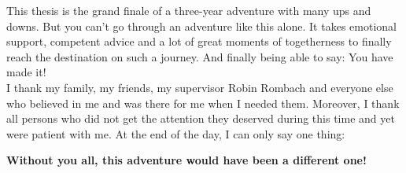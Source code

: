 This thesis is the grand finale of a three-year adventure with many ups and downs. But you can't go through an adventure like this alone. It takes emotional support, competent advice and a lot of great moments of togetherness to finally reach the destination on such a journey. And finally being able to say: You have made it!
\\

\noindent I thank my family, my friends, my supervisor Robin Rombach and everyone else who believed in me and was there for me when I needed them. Moreover, I thank all persons who did not get the attention they deserved during this time and yet were patient with me. At the end of the day, I can only say one thing:
\begin{center}
    \textbf{Without you all, this adventure would have been a different one!}
\end{center}